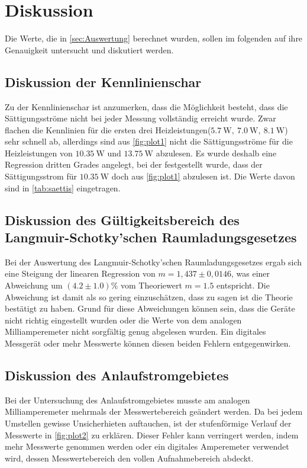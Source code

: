 \newpage
\section{Diskussion}
\label{sec:Diskussion}

Die Werte, die in \autoref{sec:Auswertung} berechnet wurden, sollen im folgenden auf ihre Genauigkeit untersucht und diskutiert werden.

\subsection{Diskussion der Kennlinienschar}
\label{subsec:DiskKenn}
Zu der Kennlinienschar ist anzumerken, dass die Möglichkeit besteht, dass die Sättigungsströme nicht bei jeder Messung vollständig erreicht wurde.
Zwar flachen die Kennlinien für die ersten drei Heizleistungen($\SI{5,7}{\watt},\ \SI{7,0}{\watt},\ \SI{8,1}{\watt}$) sehr schnell ab, allerdings 
sind aus \autoref{fig:plot1} nicht die Sättigungsströme für die Heizleistungen von $\SI{10,35}{\watt}$ und $\SI{13,75}{\watt}$ abzulesen. Es wurde deshalb eine
Regression dritten Grades angelegt, bei der festgestellt wurde, dass der Sättigungsstrom für $\SI{10,35}{\watt}$ doch aus \autoref{fig:plot1} abzulesen ist.
Die Werte davon sind in \autoref{tab:saettis} eingetragen.

\subsection{Diskussion des Gültigkeitsbereich des Langmuir-Schotky'schen Raumladungsgesetzes}
\label{subsec:DiskLangmuir}
Bei der Auswertung des Langmuir-Schotky'schen Raumladungsgesetzes ergab sich eine Steigung der linearen Regression von $m = 1,437 \pm 0,0146$, was einer
Abweichung um $(4.2 \pm 1.0)\%$ vom Theoriewert $m = 1.5$ entspricht.
Die Abweichung ist damit als so gering einzuschätzen, dass zu sagen ist die Theorie bestätigt zu haben. \newline
Grund für diese Abweichungen können sein, dass die Geräte nicht richtig eingestellt wurden oder die Werte von dem analogen Milliamperemeter nicht sorgfältig genug abgelesen wurden. Ein digitales Messgerät oder mehr Messwerte können
diesen beiden Fehlern entgegenwirken.

\subsection{Diskussion des Anlaufstromgebietes}
\label{subsec:diskAnlauf}
Bei der Untersuchung des Anlaufstromgebietes musste am analogen Milliamperemeter mehrmals der Messwertebereich geändert werden. Da bei jedem Umstellen gewisse Unsicherhieten auftauchen,
ist der stufenförmige Verlauf der Messwerte in \autoref{fig:plot2} zu erklären. Dieser Fehler kann verringert werden, indem mehr Messwerte genommen werden oder ein digitales
Amperemeter verwendet wird, dessen Messwertebereich den vollen Aufnahmebereich abdeckt.

